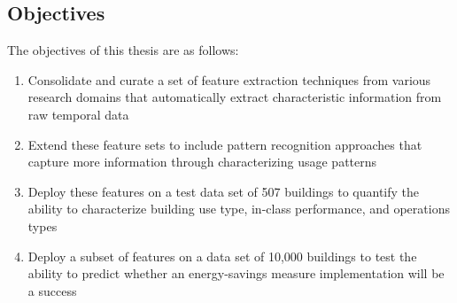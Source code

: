 \subsection{Objectives}
The objectives of this thesis are as follows:
\begin{enumerate}
\item Consolidate and curate a set of feature extraction techniques from various research domains that automatically extract characteristic information from raw temporal data
\item Extend these feature sets to include pattern recognition approaches that capture more information through characterizing usage patterns
\item Deploy these features on a test data set of 507 buildings to quantify the ability to characterize building use type, in-class performance, and operations types
\item Deploy a subset of features on a data set of 10,000 buildings to test the ability to predict whether an energy-savings measure implementation will be a success 
\end{enumerate}